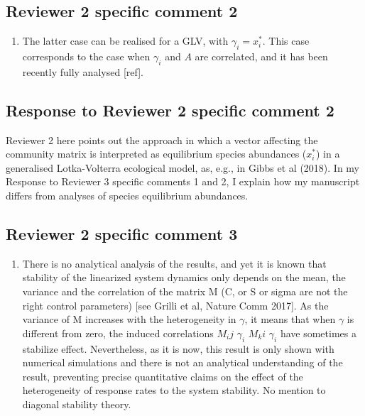 \documentclass[]{article}
\providecommand{\tightlist}{%
  \setlength{\itemsep}{0pt}\setlength{\parskip}{0pt}}
\begin{document}
\subsection{Reviewer 2 specific comment
2}\label{reviewer-2-specific-comment-2}

\begin{enumerate}
\def\labelenumi{\arabic{enumi})}
\setcounter{enumi}{1}
\tightlist
\item
  The latter case can be realised for a GLV, with \(\gamma_i=x^*_i\).
  This case corresponds to the case when \(\gamma_i\) and \(A\) are
  correlated, and it has been recently fully analysed {[}ref{]}.
\end{enumerate}

\subsection{Response to Reviewer 2 specific comment
2}\label{response-to-reviewer-2-specific-comment-2}

Reviewer 2 here points out the approach in which a vector affecting the
community matrix is interpreted as equilibrium species abundances
(\(x^*_{i}\)) in a generalised Lotka-Volterra ecological model, as,
e.g., in Gibbs et al (2018). In my Response to Reviewer 3 specific
comments 1 and 2, I explain how my manuscript differs from analyses of
species equilibrium abundances.

\subsection{Reviewer 2 specific comment
3}\label{reviewer-2-specific-comment-3}

\begin{enumerate}
\def\labelenumi{\arabic{enumi})}
\setcounter{enumi}{2}
\tightlist
\item
  There is no analytical analysis of the results, and yet it is known
  that stability of the linearized system dynamics only depends on the
  mean, the variance and the correlation of the matrix M (C, or S or
  sigma are not the right control parameters) {[}see Grilli et al,
  Nature Comm 2017{]}. As the variance of M increases with the
  heterogeneity in \(\gamma\), it means that when \(\gamma\) is
  different from zero, the induced correlations \(M_ij\) \(\gamma_i\)
  \(M_ki\) \(\gamma_i\) have sometimes a stabilize effect. Nevertheless,
  as it is now, this result is only shown with numerical simulations and
  there is not an analytical understanding of the result, preventing
  precise quantitative claims on the effect of the heterogeneity of
  response rates to the system stability. No mention to diagonal
  stability theory.
\end{enumerate}
\end{document}
